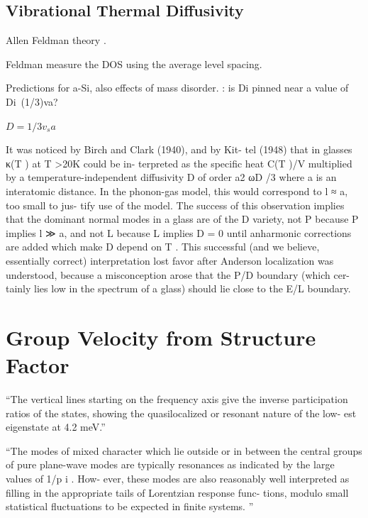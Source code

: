 \documentclass[aps,prb,preprint,superscriptaddress,amsmath,amssymb,floatfix]{revtex4}
\begin{document}
\subsection{\label{S-Motivation}Vibrational Thermal Diffusivity}
Allen Feldman theory \cite{allen_thermal_1993}.

Feldman measure the DOS using the average level spacing.
\cite{feldman_numerical_1999} 

Predictions for a-Si, also effects of mass disorder.
\cite{feldman_thermal_1993}: is Di pinned near a value of Di~(1/3)va?

$D = 1/3 v_{s} a$

It was noticed by Birch and Clark (1940), and by Kit-
tel (1948) that in glasses κ(T ) at T >20K could be in-
terpreted as the specific heat C(T )/V multiplied by a
temperature-independent diffusivity D of order a2 ωD /3
where a is an interatomic distance. In the phonon-gas
model, this would correspond to l ≈ a, too small to jus-
tify use of the model. The success of this observation
implies that the dominant normal modes in a glass are of
the D variety, not P because P implies l ≫ a, and not L
because L implies D = 0 until anharmonic corrections are
added which make D depend on T . This successful (and
we believe, essentially correct) interpretation lost favor
after Anderson localization was understood, because a
misconception arose that the P/D boundary (which cer-
tainly lies low in the spectrum of a glass) should lie close
to the E/L boundary.

\clearpage

\section{\label{S:Introduction}Group Velocity from Structure Factor}

``The vertical lines
starting on the frequency axis give the inverse participation ratios of
the states, showing the quasilocalized or resonant nature of the low-
est eigenstate at 4.2 meV.''

``The
modes of mixed character which lie outside or in between
the central groups of pure plane-wave modes are typically
resonances as indicated by the large values of 1/p i .
How-
ever, these modes are also reasonably well interpreted as
filling in the appropriate tails of Lorentzian response func-
tions, modulo small statistical fluctuations to be expected in
finite systems.
''
\end{document}
